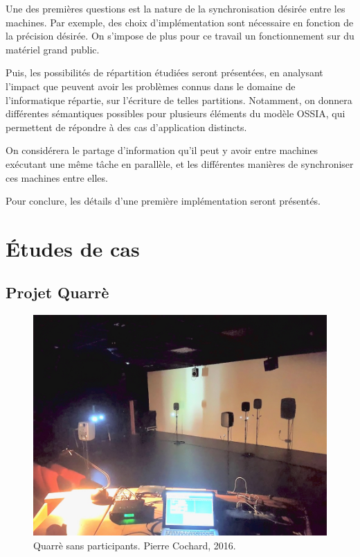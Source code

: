 \documentclass{article}
\newcommand\ossia{OSSIA\xspace}
\begin{document}
Une des premières questions est la nature de la synchronisation désirée entre les machines.
Par exemple, des choix d'implémentation sont nécessaire en fonction de la précision désirée. 
On s'impose de plus pour ce travail un fonctionnement sur du matériel grand public.

Puis, les possibilités de répartition étudiées seront présentées, en analysant l'impact que peuvent avoir les problèmes connus dans le domaine de l'informatique répartie, sur l'écriture de telles partitions. 
Notamment, on donnera différentes sémantiques possibles pour plusieurs éléments du modèle \ossia, qui permettent de répondre à des cas d'application distincts. 

On considérera le partage d'information qu'il peut y avoir entre machines exécutant une même tâche en parallèle, et les différentes manières de synchroniser ces machines entre elles.

Pour conclure, les détails d'une première implémentation seront présentés.

\section{Études de cas}

\subsection{Projet Quarrè}

\begin{figure}[h]
    \centering
    \includegraphics[scale=0.2]{images/quarre.jpg}
    \caption[Quarrè]{Quarrè sans participants. Pierre Cochard, 2016.}
    \label{img.quarre}
\end{figure}
\end{document}
